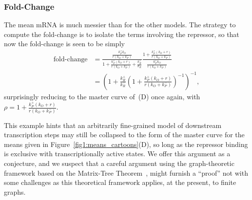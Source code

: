 \subsubsection{Fold-Change}
The mean mRNA is much messier than for the other models. The strategy to compute
the fold-change is to isolate the terms involving the repressor, so that now the
fold-change is seen to be simply
\begin{align}
\text{fold-change}
&= \frac{\frac{k_P^+ k_O}{r(k_O + k_P^-)}}
        {1 + \frac{k_P^+ (k_O + r)}{r(k_O + k_P^-)} + \frac{k_R^+}{k_R^-}}
        \frac{1 + \frac{k_P^+ (k_O + r)}{r(k_O + k_P^-)}}
                {\frac{k_P^+ k_O}{r(k_O + k_P^-)}}
\\
&= \left(
        1 + \frac{k_R^+}{k_R^-}
        \left(1 + \frac{k_P^+ (k_O + r)}{r(k_O + k_P^-)}\right)^{-1}
\right)^{-1},
\end{align}
surprisingly reducing to the master curve of~(D) once
again, with $\rho = 1 + \frac{k_P^+ (k_O + r)}{r(k_O + k_P^-)}$.

This example hints that an arbitrarily fine-grained model of downstream
transcription steps may still be collapsed to the form of the master curve for
the means given in Figure~\ref{fig1:means_cartoons}(D), so long as the repressor
binding is exclusive with transcriptionally active states. We offer this
argument as a conjecture, and we suspect that a careful argument using the
graph-theoretic framework based on the Matrix-Tree
Theorem~\cite{Gunawardena2012}, might furnish a ``proof'' not with some
challenges as this theoretical framework applies, at the present, to finite
graphs.

